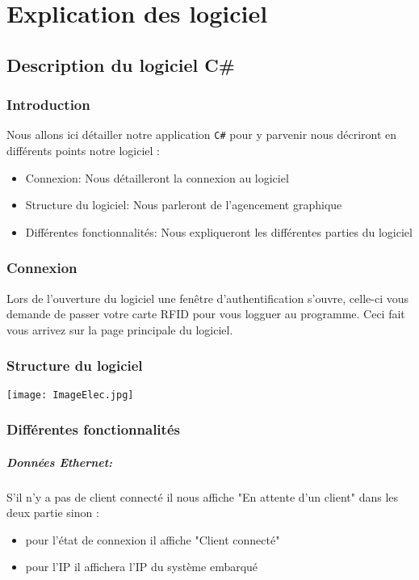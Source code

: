 \documentclass[12pt,a4paper]{report}
\begin{document}
			
\chapter{Explication des logiciel}
	\section{Description du logiciel C\#}
		\subsection{Introduction}
		Nous allons ici détailler notre application \verb+C#+ pour y parvenir nous décriront en différents points notre logiciel : 
			\begin{itemize}
			\item Connexion: Nous détailleront la connexion au logiciel
			\item Structure du logiciel: Nous parleront de l'agencement graphique
			\item Différentes fonctionnalités: Nous expliqueront les différentes parties du logiciel
			\end{itemize}
		\subsection{Connexion}
		Lors de l'ouverture du logiciel une fenêtre d'authentification s'ouvre, celle-ci  vous demande de passer votre carte RFID pour vous logguer au programme. Ceci fait vous arrivez sur la page principale du logiciel.
		\subsection{Structure du logiciel}
		\begin{center}
		\texttt{[image: ImageElec.jpg]}
		\end{center}
		
		
		\subsection{Différentes fonctionnalités}
			\paragraph{Données Ethernet:}S'il n'y a pas de client connecté il nous affiche "En attente d'un client" dans les deux partie sinon :
			\begin{itemize}
			\item pour l'état de connexion il affiche "Client connecté" 
			\item pour l'IP il affichera l'IP du système embarqué			
			\end{itemize}
\end{document}
